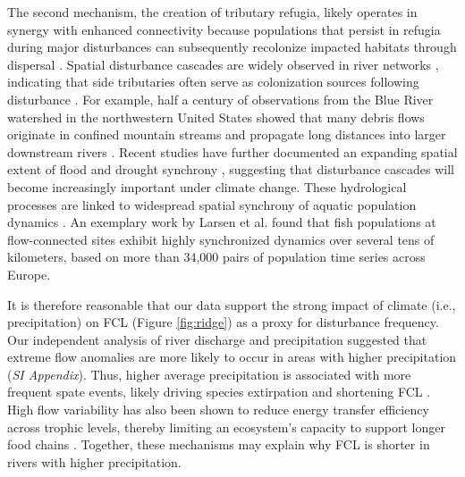 \documentclass[9pt,twocolumn,twoside]{pnas-new}
\begin{document}
The second mechanism, the creation of tributary refugia, likely operates in synergy with enhanced connectivity because populations that persist in refugia during major disturbances can subsequently recolonize impacted habitats through dispersal \citep{pomeranz_ecosystem_2023, koizumi_fishermen_2013}.
Spatial disturbance cascades are widely observed in river networks \citep{stanley_ecosystem_1997, swanson_flood_1998, nakamura_disturbance_2000, gomi_understanding_2002, messager_global_2021}, indicating that side tributaries often serve as colonization sources following disturbance \citep{koizumi_fishermen_2013}. 
For example, half a century of observations from the Blue River watershed in the northwestern United States showed that many debris flows originate in confined mountain streams and propagate long distances into larger downstream rivers \citep{nakamura_disturbance_2000}.
Recent studies have further documented an expanding spatial extent of flood and drought synchrony \citep{berghuijs_growing_2019, sharma_spatial_2024}, suggesting that disturbance cascades will become increasingly important under climate change. 
These hydrological processes are linked to widespread spatial synchrony of aquatic population dynamics \citep{sarremejane_drought_2021, larsen_geography_2021, tamario_barriers_2025}. 
An exemplary work by Larsen et al. \citep{larsen_geography_2021} found that fish populations at flow-connected sites exhibit highly synchronized dynamics over several tens of kilometers, based on more than 34,000 pairs of population time series across Europe.

It is therefore reasonable that our data support the strong impact of climate (i.e., precipitation) on FCL (Figure \ref{fig:ridge}) as a proxy for disturbance frequency.
Our independent analysis of river discharge and precipitation suggested that extreme flow anomalies are more likely to occur in areas with higher precipitation (\textit{SI Appendix}).
Thus, higher average precipitation is associated with more frequent spate events, likely driving species extirpation and shortening FCL \citep{sabo_food_2009, sabo_role_2010}. 
High flow variability has also been shown to reduce energy transfer efficiency across trophic levels, thereby limiting an ecosystem's capacity to support longer food chains \citep{baruch_food_2023}. 
Together, these mechanisms may explain why FCL is shorter in rivers with higher precipitation.
\end{document}

